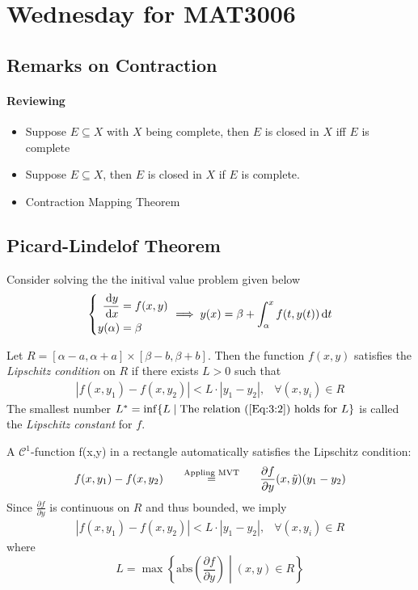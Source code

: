 \section{Wednesday for MAT3006}
\subsection{Remarks on Contraction}
\paragraph{Reviewing}
\begin{itemize}
\item
Suppose $E\subseteq X$ with $X$ being complete, then
$E$ is closed in $X$ iff $E$ is complete
\item
Suppose $E\subseteq X$, then
$E$ is closed in $X$ if $E$ is complete.
\item
Contraction Mapping Theorem
\end{itemize}

\subsection{Picard-Lindelof Theorem}

Consider solving the the initival value problem given below
\begin{equation}\label{Eq:3:11}
\left\{
\begin{aligned}
\frac{\diff y}{\diff x}&=f(x,y)\\
y(\alpha)&=\beta
\end{aligned}
\right.
\implies
y(x)=\beta+\int_{\alpha}^xf(t,y(t))\diff t
\end{equation}


\begin{definition}
Let $R=[\alpha-a,\alpha+a]\times[\beta-b,\beta+b]$. Then the function $f(x,y)$ satisfies the \emph{Lipschitz condition} on $R$ if there exists $L>0$ such that
\begin{equation}\label{Eq:3:2}
\begin{array}{ll}
|f(x,y_1)-f(x,y_2)|<L\cdot |y_1-y_2|,
&
\forall (x,y_i)\in R
\end{array}
\end{equation}
The smallest number $L^*=\inf\{L\mid\text{The relation (\ref{Eq:3:2}) holds for $L$}\}$ is called the \emph{Lipschitz constant} for $f$.
\end{definition}

\begin{example}
A $\mathcal{C}^1$-function f(x,y) in a rectangle automatically satisfies the Lipschitz condition:
\[
f(x,y_1)-f(x,y_2)
\makebox[3cm][c]{$\overset{\text{Appling MVT}} =$}
\frac{\partial f}{\partial y}(x,\tilde y)(y_1-y_2)
\]
Since $\frac{\partial f}{\partial y}$ is continuous on $R$ and thus bounded, we imply
\[
\begin{array}{ll}
|f(x,y_1)-f(x,y_2)|<L\cdot |y_1-y_2|,
&
\forall (x,y_i)\in R
\end{array}
\]
where
\[
L=\max\left\{
\text{abs}\left(
\frac{\partial f}{\partial y}
\right)\middle|
(x,y)\in R
\right\}
\]
\end{example}

